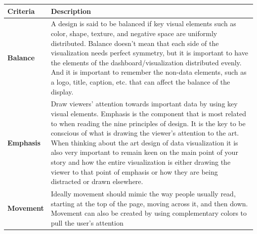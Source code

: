 \documentclass[]{book}
\theoremstyle{definition}
\theoremstyle{definition}
\theoremstyle{definition}
\theoremstyle{remark}
\begin{document}
\begin{longtable}[]{@{}ll@{}}
\toprule
\begin{minipage}[b]{0.16\columnwidth}\raggedright\strut
\textbf{Criteria}\strut
\end{minipage} & \begin{minipage}[b]{0.78\columnwidth}\raggedright\strut
\textbf{Description}\strut
\end{minipage}\tabularnewline
\midrule
\endhead
\begin{minipage}[t]{0.16\columnwidth}\raggedright\strut
\textbf{Balance}\strut
\end{minipage} & \begin{minipage}[t]{0.78\columnwidth}\raggedright\strut
A design is said to be balanced if key visual elements such as color,
shape, texture, and negative space are uniformly distributed. Balance
doesn't mean that each side of the visualization needs perfect symmetry,
but it is important to have the elements of the dashboard/visualization
distributed evenly. And it is important to remember the non-data
elements, such as a logo, title, caption, etc. that can affect the
balance of the display.\strut
\end{minipage}\tabularnewline
\begin{minipage}[t]{0.16\columnwidth}\raggedright\strut
\textbf{Emphasis}\strut
\end{minipage} & \begin{minipage}[t]{0.78\columnwidth}\raggedright\strut
Draw viewers' attention towards important data by using key visual
elements. Emphasis is the component that is most related to when reading
the nine principles of design. It is the key to be conscious of what is
drawing the viewer's attention to the art. When thinking about the art
design of data visualization it is also very important to remain keen on
the main point of your story and how the entire visualization is either
drawing the viewer to that point of emphasis or how they are being
distracted or drawn elsewhere.\strut
\end{minipage}\tabularnewline
\begin{minipage}[t]{0.16\columnwidth}\raggedright\strut
\textbf{Movement}\strut
\end{minipage} & \begin{minipage}[t]{0.78\columnwidth}\raggedright\strut
Ideally movement should mimic the way people usually read, starting at
the top of the page, moving across it, and then down. Movement can also
be created by using complementary colors to pull the user's attention

\end{minipage}
\end{longtable}
\end{document}
